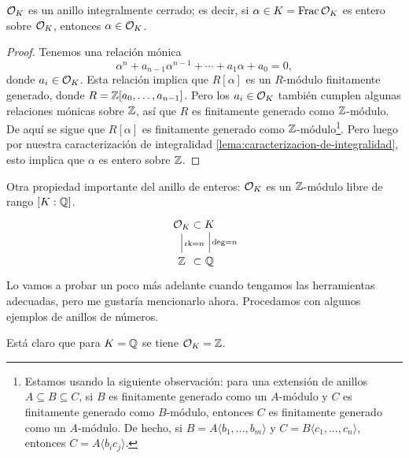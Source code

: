 \begin{proposicion}
  $\mathcal{O}_K$ es un anillo integralmente cerrado; es decir, si
  $\alpha\in K = \operatorname{Frac}\mathcal{O}_K$ es entero sobre $\mathcal{O}_K$, entonces
  $\alpha \in \mathcal{O}_K$.

  \begin{proof}
    Tenemos una relación mónica
    $$\alpha^n + a_{n-1} \alpha^{n-1} + \cdots + a_1 \alpha + a_0 = 0,$$
    donde $a_i \in \mathcal{O}_K$. Esta relación implica que $R [\alpha]$
    es un $R$-módulo finitamente generado, donde
    $R = \mathbb{Z} [a_0,\ldots,a_{n-1}]$. Pero los $a_i\in \mathcal{O}_K$ también cumplen
    algunas relaciones mónicas sobre $\mathbb{Z}$, así que $R$ es finitamente
    generado como $\mathbb{Z}$-módulo. De aquí se sigue que $R [\alpha]$
    es finitamente generado como $\mathbb{Z}$-módulo\footnote{Estamos usando la
      siguiente observación: para una extensión de anillos
      $A \subseteq B \subseteq C$, si $B$ es finitamente generado como un
      $A$-módulo y $C$ es finitamente generado como $B$-módulo, entonces
      $C$ es finitamente generado como un $A$-módulo. De hecho, si
      $B = A\langle b_1,\ldots,b_m\rangle$ y
      $C = B\langle c_1,\ldots,c_n\rangle$, entonces
      $C = A\langle b_i c_j \rangle$.}.
    Pero luego por nuestra caracterización de integralidad
    \ref{lema:caracterizacion-de-integralidad}, esto implica que $\alpha$ es
    entero sobre $\mathbb{Z}$.
  \end{proof}
\end{proposicion}

Otra propiedad importante del anillo de enteros: $\mathcal{O}_K$ es un $\mathbb{Z}$-módulo libre
de rango $[K : \mathbb{Q}]$.
\[ \begin{tikzcd}
  \O_K \ar[-]{d}{\rk = n} &[-3em] \subset &[-3em] K \ar[-]{d}{\deg = n} \\
  \ZZ & \subset & \QQ
\end{tikzcd} \]
Lo vamos a probar un poco más adelante cuando tengamos las herramientas
adecuadas, pero me gustaría mencionarlo ahora. Procedamos con algunos ejemplos
de anillos de números.

\begin{ejemplo}
  Está claro que para $K = \mathbb{Q}$ se tiene $\mathcal{O}_K = \mathbb{Z}$.
\end{ejemplo}

